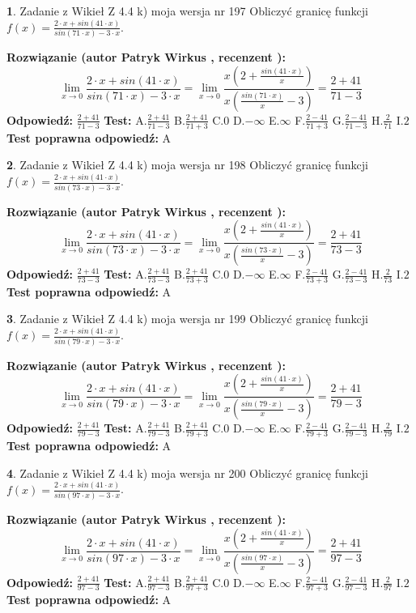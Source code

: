 \documentclass[12pt, a4paper]{article}
\theoremstyle{definition} %
\newtheorem{zad}{}
\newcommand{\zadStart}[1]{\begin{zad}#1\newline}
\newcommand{\zadStop}{\end{zad}}
\newcommand{\rozwStart}[2]{\noindent \textbf{Rozwiązanie (autor #1 , recenzent #2): }\newline}
\newcommand{\rozwStop}{\newline}
\newcommand{\odpStart}{\noindent \textbf{Odpowiedź:}\newline}
\newcommand{\odpStop}{\newline}
\newcommand{\testStart}{\noindent \textbf{Test:}\newline}
\newcommand{\testStop}{\newline}
\newcommand{\kluczStart}{\noindent \textbf{Test poprawna odpowiedź:}\newline}
\newcommand{\kluczStop}{\newline}
\begin{document}
\zadStart{Zadanie z Wikieł Z 4.4 k) moja wersja nr 197}
Obliczyć granicę funkcji $f(x)=\frac{2\cdot x +sin(41\cdot x)}{sin(71\cdot x) -3\cdot x}$.
\zadStop
\rozwStart{Patryk Wirkus}{}
$$\lim\limits_{x\to 0}\frac{2\cdot x +sin(41\cdot x)}{sin(71\cdot x) -3\cdot x}
=\lim\limits_{x\to 0}\frac{x(2+\frac{sin(41\cdot x)}{x})}{x(\frac{sin(71\cdot x)}{x}-3)}
=\frac{2+41}{71-3}$$
\rozwStop
\odpStart
$\frac{2+41}{71-3}$
\odpStop
\testStart
A.$\frac{2+41}{71-3}$
B.$\frac{2+41}{71+3}$
C.$0$
D.$-\infty$
E.$\infty$
F.$\frac{2-41}{71+3}$
G.$\frac{2-41}{71-3}$
H.$\frac{2}{71}$
I.$2$
\testStop
\kluczStart
A
\kluczStop



\zadStart{Zadanie z Wikieł Z 4.4 k) moja wersja nr 198}
Obliczyć granicę funkcji $f(x)=\frac{2\cdot x +sin(41\cdot x)}{sin(73\cdot x) -3\cdot x}$.
\zadStop
\rozwStart{Patryk Wirkus}{}
$$\lim\limits_{x\to 0}\frac{2\cdot x +sin(41\cdot x)}{sin(73\cdot x) -3\cdot x}
=\lim\limits_{x\to 0}\frac{x(2+\frac{sin(41\cdot x)}{x})}{x(\frac{sin(73\cdot x)}{x}-3)}
=\frac{2+41}{73-3}$$
\rozwStop
\odpStart
$\frac{2+41}{73-3}$
\odpStop
\testStart
A.$\frac{2+41}{73-3}$
B.$\frac{2+41}{73+3}$
C.$0$
D.$-\infty$
E.$\infty$
F.$\frac{2-41}{73+3}$
G.$\frac{2-41}{73-3}$
H.$\frac{2}{73}$
I.$2$
\testStop
\kluczStart
A
\kluczStop



\zadStart{Zadanie z Wikieł Z 4.4 k) moja wersja nr 199}
Obliczyć granicę funkcji $f(x)=\frac{2\cdot x +sin(41\cdot x)}{sin(79\cdot x) -3\cdot x}$.
\zadStop
\rozwStart{Patryk Wirkus}{}
$$\lim\limits_{x\to 0}\frac{2\cdot x +sin(41\cdot x)}{sin(79\cdot x) -3\cdot x}
=\lim\limits_{x\to 0}\frac{x(2+\frac{sin(41\cdot x)}{x})}{x(\frac{sin(79\cdot x)}{x}-3)}
=\frac{2+41}{79-3}$$
\rozwStop
\odpStart
$\frac{2+41}{79-3}$
\odpStop
\testStart
A.$\frac{2+41}{79-3}$
B.$\frac{2+41}{79+3}$
C.$0$
D.$-\infty$
E.$\infty$
F.$\frac{2-41}{79+3}$
G.$\frac{2-41}{79-3}$
H.$\frac{2}{79}$
I.$2$
\testStop
\kluczStart
A
\kluczStop



\zadStart{Zadanie z Wikieł Z 4.4 k) moja wersja nr 200}
Obliczyć granicę funkcji $f(x)=\frac{2\cdot x +sin(41\cdot x)}{sin(97\cdot x) -3\cdot x}$.
\zadStop
\rozwStart{Patryk Wirkus}{}
$$\lim\limits_{x\to 0}\frac{2\cdot x +sin(41\cdot x)}{sin(97\cdot x) -3\cdot x}
=\lim\limits_{x\to 0}\frac{x(2+\frac{sin(41\cdot x)}{x})}{x(\frac{sin(97\cdot x)}{x}-3)}
=\frac{2+41}{97-3}$$
\rozwStop
\odpStart
$\frac{2+41}{97-3}$
\odpStop
\testStart
A.$\frac{2+41}{97-3}$
B.$\frac{2+41}{97+3}$
C.$0$
D.$-\infty$
E.$\infty$
F.$\frac{2-41}{97+3}$
G.$\frac{2-41}{97-3}$
H.$\frac{2}{97}$
I.$2$
\testStop
\kluczStart
A
\kluczStop
\end{document}
